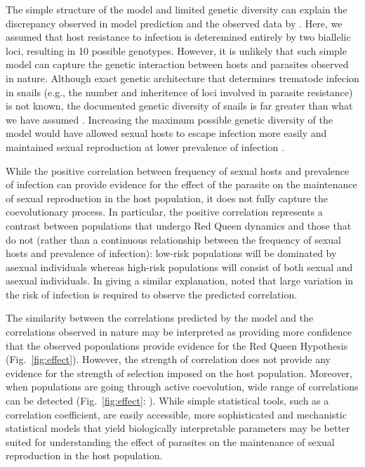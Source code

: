 \documentclass{article}\usepackage[]{graphicx}\usepackage[]{color}
\newcommand{\fref}[1]{Fig.~\ref{fig:#1}}
\begin{document}
The simple structure of the model and limited genetic diversity can explain the discrepancy observed in model prediction and the observed data by \cite{mckone2016fine}.
Here, we assumed that host resistance to infection is deteremined entirely by two biallelic loci, resulting in 10 possible genotypes.
However, it is unlikely that such simple model can capture the genetic interaction between hosts and parasites observed in nature.
Although exact genetic architecture that determines trematode infecion in snails (e.g., the number and inheritence of loci involved in parasite resistance) is not known, the documented genetic diversity of snails is far greater than what we have assumed \citep{fox1996genetic, king2011parasites, dagan2013clonal}.
Increasing the maximum possible genetic diversity of the model would have allowed sexual hosts to escape infection more easily and maintained sexual reproduction at lower prevalence of infection \citep{lively2010effect, king2012does, ashby2015diversity}.

While the positive correlation between frequency of sexual hosts and prevalence of infection can provide evidence for the effect of the parasite on the maintenance of sexual reproduction in the host population, it does not fully capture the coevolutionary process.
In particular, the positive correlation represents a contrast between populations that undergo Red Queen dynamics and those that do not (rather than a continuous relationship between the frequency of sexual hosts and prevalence of infection):
low-risk populations will be dominated by asexual individuals whereas high-risk populations will consist of both sexual and asexual individuals.
In giving a similar explanation, \cite{lively2001trematode} noted that large variation in the risk of infection is required to observe the predicted correlation.

The similarity between the correlations predicted by the model and the correlations observed in nature may be interpreted as providing more confidence that the observed popoulations provide evidence for the Red Queen Hypothesis (\fref{effect}).
However, the strength of correlation does not provide any evidence for the strength of selection imposed on the host population.
Moreover, when populations are going through active coevolution, wide range of correlations can be detected (\fref{effect}: \cite{vergara2014infection}).
While simple statistical tools, such as a correlation coefficient, are easily accessible,
more sophisticated and mechanistic statistical models that yield biologically interpretable parameters may be better suited for understanding the effect of parasites on the maintenance of sexual reproduction in the host population.
\end{document}
